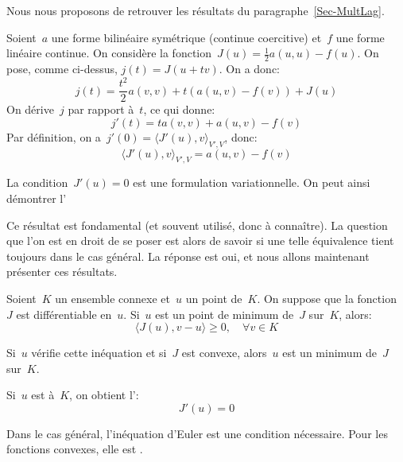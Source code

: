 \begin{remarque}
\normalsize Nous nous proposons de retrouver les résultats du paragraphe~\ref{Sec-MultLag}.

Soient~$a$ une forme bilinéaire symétrique (continue coercitive) et~$f$ une forme linéaire continue.
On considère la fonction~$J(u)=\frac12a(u,u)-f(u)$.
On pose, comme ci-dessus, $j(t)=J(u+tv)$. On a donc:
\[ j(t)=\frac{t^2}2a(v,v)+t\left(a(u,v)-f(v)\right)+J(u) \]
On dérive~$j$ par rapport à~$t$, ce qui donne:
\[ j'(t)=ta(v,v)+a(u,v)-f(v) \]
Par définition, on a~$j'(0)=\langle J'(u),v\rangle_{V',V}$, donc:
\[ \langle J'(u),v\rangle_{V',V} = a(u,v)-f(v) \]

La condition~$J'(u)=0$ est une formulation variationnelle.
On peut ainsi démontrer l'

Ce résultat est fondamental (et souvent utilisé, donc à connaître). La question que l'on est en droit de se poser est alors de savoir si une telle équivalence tient toujours dans le cas général. La réponse est oui, et nous allons maintenant présenter ces résultats.
\end{remarque}

\begin{theoreme}
Soient~$K$ un ensemble connexe et~$u$ un point de~$K$. On suppose que la fonction~$J$ est différentiable en~$u$. Si~$u$ est un point de minimum  de~$J$ sur~$K$, alors:
\begin{equation}
\langle J(u),v-u\rangle \ge 0, \quad \forall v\in K
\end{equation}

Si~$u$ vérifie cette inéquation et si~$J$ est convexe, alors~$u$ est un minimum  de~$J$ sur~$K$.
\end{theoreme}

Si~$u$ est  à~$K$, on obtient l':
\begin{equation}
J'(u)=0
\end{equation}

Dans le cas général, l'inéquation d'Euler est une condition nécessaire.
Pour les fonctions convexes, elle est .


